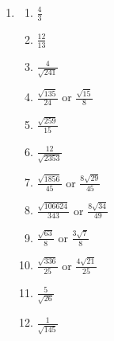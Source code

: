 \documentclass[a4paper,12pt]{article}
\begin{document}
\begin{enumerate}
\item 
    \begin{multicols}{2}
    \begin{enumerate}
    \item $\frac{4}{3}$
    \item $\frac{12}{13}$
    \item $\frac{4}{\sqrt{241}}$
    \item $\frac{\sqrt{135}}{24}$ or $\frac{\sqrt{15}}{8}$
    \item $\frac{\sqrt{259}}{15}$
    \item $\frac{12}{\sqrt{2353}}$
    \item $\frac{\sqrt{1856}}{45}$ or $\frac{8\sqrt{29}}{45}$
    \item $\frac{\sqrt{106624}}{343}$ or $\frac{8\sqrt{34}}{49}$
    \item $\frac{\sqrt{63}}{8}$ or $\frac{3\sqrt{7}}{8}$
    \item $\frac{\sqrt{336}}{25}$ or $\frac{4\sqrt{21}}{25}$
    \item $\frac{5}{\sqrt{26}}$
    \item $\frac{1}{\sqrt{145}}$
    \end{enumerate}
    \end{multicols}
\end{enumerate}
\end{document}
